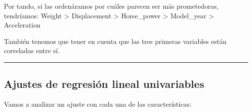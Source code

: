 \documentclass[
]{article}
\newenvironment{Shaded}{\begin{snugshade}}{\end{snugshade}}
\newcommand{\DataTypeTok}[1]{\textcolor[rgb]{0.13,0.29,0.53}{#1}}
\newcommand{\KeywordTok}[1]{\textcolor[rgb]{0.13,0.29,0.53}{\textbf{#1}}}
\newcommand{\NormalTok}[1]{#1}
\newcommand{\OperatorTok}[1]{\textcolor[rgb]{0.81,0.36,0.00}{\textbf{#1}}}
\newcommand{\StringTok}[1]{\textcolor[rgb]{0.31,0.60,0.02}{#1}}
\begin{document}
Por tando, si las ordenáramos por cuáles parecen ser más prometedoras,
tendríamos: Weight \textgreater{} Displacement \textgreater{}
Horse\_power \textgreater{} Model\_year \textgreater{} Acceleration

También tenemos que tener en cuenta que las tres primeras variables
están correladas entre sí.

\begin{center}\rule{0.5\linewidth}{0.5pt}\end{center}

\hypertarget{ajustes-de-regresiuxf3n-lineal-univariables}{%
\subsection{Ajustes de regresión lineal
univariables}\label{ajustes-de-regresiuxf3n-lineal-univariables}}

Vamos a analizar un ajuste con cada una de las características:

\begin{Shaded}
\end{Shaded}
\end{document}
